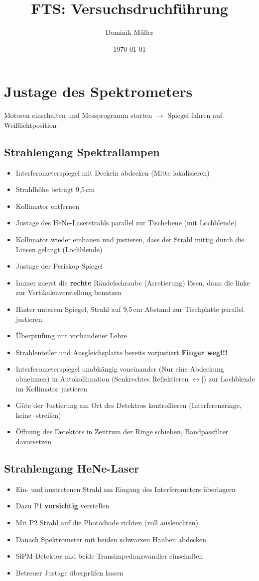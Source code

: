 \documentclass[a4paper, twoside]{article}
\begin{document}
\title{FTS: Versuchsdruchführung}
\author{Dominik Müller}
\date{\today}
\maketitle
\section{Justage des Spektrometers}
Motoren einschalten und Messprogramm starten $\to$ Spiegel fahren auf Weißlichtposition
\subsection{Strahlengang Spektrallampen}
\begin{itemize}
	\item Interferometerspiegel mit Deckeln abdecken (Mitte lokalisieren)
	\item Strahlhöhe beträgt 9,5$\,$cm
	\item Kollimator entfernen
	\item Justage des HeNe-Laserstrahls parallel zur Tischebene (mit Lochblende)
	\item Kollimator wieder einbauen und justieren, dass der Strahl mittig durch die Linsen gelangt (Lochblende)
	\item Justage der Periskop-Spiegel
	\item Immer zuerst die \textbf{rechte} Rändelschraube (Arretierung) lösen, dann die linke zur Vertikalenverstellung benutzen
	\item Hinter unterem Spiegel, Strahl auf 9,5$\,$cm Abstand zur Tischplatte parallel justieren
	\item Überprüfung mit vorhandener Lehre
	\item Strahlenteiler und Ausgleichsplatte bereits vorjustiert \textbf{Finger weg!!!}
	\item Interferometerspiegel unabhängig voneinander (Nur eine Abdeckung abnehmen) in Autokollimation (Senkrechtes Reflektieren $\leftrightarrow|$) zur Lochblende im Kollimator justieren
	\item Güte der Justierung am Ort des Detektros kontrollieren (Interferenzringe, keine -streifen)
	\item Öffnung des Detektors in Zentrum der Ringe schieben, Bandpassfilter davorsetzen 
\end{itemize}
\subsection{Strahlengang HeNe-Laser}
\begin{itemize}
	\item Ein- und austretenen Strahl am Eingang des Interferometers überlagern
	\item Dazu P1 \textbf{vorsichtig} verstellen
	\item Mit P2 Strahl auf die Photodiode richten (voll ausleuchten)
	\item Danach Spektrometer mit beiden schwarzen Hauben abdecken
	\item SiPM-Detektor und beide Transimpedanzwandler einschalten
	\item Betreuer Justage überprüfen lassen
\end{itemize}
\end{document}
